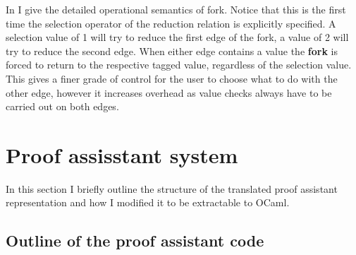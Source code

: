 \documentclass[12pt,twoside,notitlepage]{report}
\begin{document}

In  I give the detailed operational semantics of fork. Notice that this is the first time the selection operator of the reduction relation is explicitly specified. A selection value of 1 will try to reduce the first edge of the fork, a value of 2 will try to reduce the second edge. When either edge contains a value the \textbf{fork} is forced to return to the respective tagged value, regardless of the selection value. This gives a finer grade of control for the user to choose what to do with the other edge, however it increases overhead as value checks always have to be carried out on both edges.   \clearpage
\section{Proof assisstant system}
In this section I briefly outline the structure of the translated proof assistant representation and how I modified it to be extractable to OCaml. 
\subsection{Outline of the proof assistant code}
\end{document}

